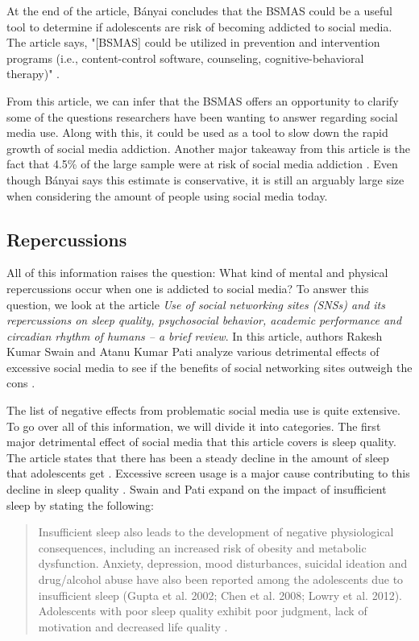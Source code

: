 \documentclass[12pt, journal, compsoc]{IEEEtran}
\begin{document}
At the end of the article, B\'anyai concludes that the BSMAS could be a useful tool to determine if adolescents are risk of becoming addicted to social media. The article says, "[BSMAS] could be utilized in prevention and intervention programs (i.e., content-control software, counseling, cognitive-behavioral therapy)" \cite{ProblematicUse}. 

From this article, we can infer that the BSMAS offers an opportunity to clarify some of the questions researchers have been wanting to answer regarding social media use. Along with this, it could be used as a tool to slow down the rapid growth of social media addiction. Another major takeaway from this article is the fact that 4.5\% of the large sample were at risk of social media addiction \cite{ProblematicUse}. Even though B\'anyai says this estimate is conservative, it is still an arguably large size when considering the amount of people using social media today.

\subsection{Repercussions}

\hspace{12pt} All of this information raises the question: What kind of mental and physical repercussions occur when one is addicted to social media? To answer this question, we look at the article \textit{Use of social networking sites (SNSs) and its repercussions on sleep quality, psychosocial behavior, academic performance and circadian rhythm of humans – a brief review}. In this article, authors Rakesh Kumar Swain and Atanu Kumar Pati analyze various detrimental effects of excessive social media to see if the benefits of social networking sites outweigh the cons \cite{Repercussions}. 

The list of negative effects from problematic social media use is quite extensive. To go over all of this information, we will divide it into categories. The first major detrimental effect of social media that this article covers is sleep quality. The article states that there has been a steady decline in the amount of sleep that adolescents get \cite{Repercussions}. Excessive screen usage is a major cause contributing to this decline in sleep quality \cite{Repercussions}. Swain and Pati expand on the impact of insufficient sleep by stating the following: 
\begin{quote}
    Insufficient sleep also leads to the development of negative physiological consequences, including an increased risk of obesity and metabolic dysfunction. Anxiety, depression, mood disturbances, suicidal ideation and drug/alcohol abuse have also been reported among the adolescents due to insufficient sleep (Gupta et al. 2002; Chen et al. 2008; Lowry et al. 2012). Adolescents with poor sleep quality exhibit poor judgment, lack of motivation and decreased life quality \cite{Repercussions}.
\end{quote} 
\end{document}
